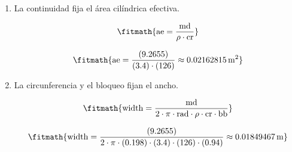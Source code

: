 \begin{enumerate}

\item La continuidad fija el área cilíndrica efectiva.

\[\fitmath{\mathrm{ae}=\frac{\mathrm{md}}{\rho\cdot \mathrm{cr}}}\]

\[\fitmath{\mathrm{ae}=\frac{(9.2655)}{(3.4)\cdot (126)}\approx 0.02162815\,\mathrm{m^{2}}}\]

\item La circunferencia y el bloqueo fijan el ancho.

\[\fitmath{\mathrm{width}=\frac{\mathrm{md}}{2\cdot \pi\cdot \mathrm{rad}\cdot \rho\cdot \mathrm{cr}\cdot \mathrm{bb}}}\]

\[\fitmath{\mathrm{width}=\frac{(9.2655)}{2\cdot \pi\cdot (0.198)\cdot (3.4)\cdot (126)\cdot (0.94)}\approx 0.01849467\,\mathrm{m}}\]

\end{enumerate}
